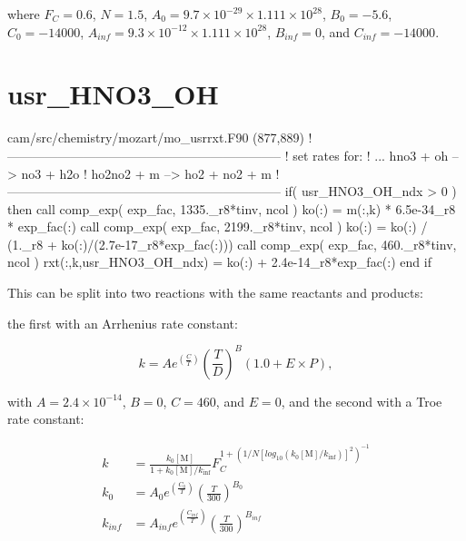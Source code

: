 \documentclass[titlepage]{article}
\begin{document}
\noindent where $F_C = 0.6$, $N = 1.5$, $A_0 = 9.7 \times 10^{-29} \times 1.111 \times 10^{28}$, $B_0 = -5.6$, $C_0 = -14000$, $A_{inf} = 9.3 \times 10^{-12} \times 1.111 \times 10^{28}$, $B_{inf} = 0$, and $C_{inf} = -14000$.


\section{usr\_HNO3\_OH}

\begin{blockcode}[commandchars=\\\{\}]
\color{gray}cam/src/chemistry/mozart/mo_usrrxt.F90 (877,889)
!-----------------------------------------------------------------
! set rates for:
!   ... hno3 + oh --> no3 + h2o
!           ho2no2 + m --> ho2 + no2 + m
!-----------------------------------------------------------------
       if( usr_HNO3_OH_ndx > 0 ) then
          call comp_exp( exp_fac, 1335._r8*tinv, ncol )
          ko(:) = m(:,k) * 6.5e-34_r8 * exp_fac(:)
          call comp_exp( exp_fac, 2199._r8*tinv, ncol )
          ko(:) = ko(:) / (1._r8 + ko(:)/(2.7e-17_r8*exp_fac(:)))
          call comp_exp( exp_fac, 460._r8*tinv, ncol )
          rxt(:,k,usr_HNO3_OH_ndx) = ko(:) + 2.4e-14_r8*exp_fac(:)
       end if
\end{blockcode}

This can be split into two reactions with the same reactants and products:
\vspace{20px}


\vspace{20px}
\noindent the first with an Arrhenius rate constant:

\begin{equation}
k = Ae^{(\frac{C}{T})}(\frac{T}{D})^B(1.0+E \times P),
\end{equation}

\noindent with $A = 2.4 \times 10^{-14}$, $B = 0$, $C = 460$, and $E = 0$, and the second
with a Troe rate constant:

\begin{equation}
\begin{split}
k & = \frac{k_0[\mbox{M}]}{1+k_0[\mbox{M}]/k_{\inf}}F_C^{1+(1/N[log_{10}(k_0[\mbox{M}]/k_{\inf})]^2)^{-1}} \\
k_0 & = A_0 e^{\left( \frac{C_0}{T} \right)} \left( \frac{T}{300} \right)^{B_0} \\
k_{inf} & = A_{inf} e^{\left( \frac{C_{inf}}{T} \right)} \left( \frac{T}{300} \right)^{B_{inf}}
\end{split}
\end{equation}
\end{document}
